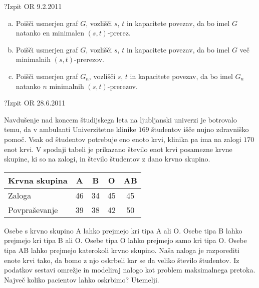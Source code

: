 \begin{naloga}{?}{Izpit OR 9.2.2011}
\begin{vprasanje}
\begin{enumerate}[(a)]
\item Poišči usmerjen graf $G$, vozlišči $s$, $t$ in kapacitete povezav,
da bo imel $G$ natanko en minimalen $(s, t)$-prerez.

\item Poišči usmerjen graf $G$, vozlišči $s$, $t$ in kapacitete povezav,
da bo imel $G$ več minimalnih $(s, t)$-prerezov.

\item Poišči usmerjen graf $G_n$, vozlišči $s$, $t$ in kapacitete povezav,
da bo imel $G_n$ natanko $n$ minimalnih $(s, t)$-prerezov.
\end{enumerate}
\end{vprasanje}
\begin{odgovor}
\end{odgovor}
\end{naloga}


\begin{naloga}{?}{Izpit OR 28.6.2011}
\begin{vprasanje}[kri]
Navdušenje nad koncem študijskega leta na ljubljanski univerzi
je botrovalo temu,
da v ambulanti Univerzitetne klinike
$169$ študentov išče nujno zdravniško pomoč.
Vsak od študentov potrebuje eno enoto krvi,
klinika pa ima na zalogi $170$ enot krvi.
V spodnji tabeli je prikazano število enot krvi posamezne krvne skupine,
ki so na zalogi,
in število študentov z dano krvno skupino.
\begin{center}
\begin{tabular}{l|cccc}
Krvna skupina &  A &  B &  O & AB \\ \hline
Zaloga        & 46 & 34 & 45 & 45 \\
Povpraševanje & 39 & 38 & 42 & 50
\end{tabular}
\end{center}
Osebe s krvno skupino A lahko prejmejo kri tipa A ali O.
Osebe tipa B lahko prejmejo kri tipa B ali O.
Osebe tipa O lahko prejmejo samo kri tipa O.
Osebe tipa AB lahko prejmejo katerokoli krvno skupino.
Naša naloga je razporediti enote krvi tako,
da bomo z njo oskrbeli kar se da veliko število študentov.
Iz podatkov sestavi omrežje
in modeliraj nalogo kot problem maksimalnega pretoka.
Največ koliko pacientov lahko oskrbimo?
Utemelji.
\end{vprasanje}
\begin{odgovor}
\end{odgovor}
\end{naloga}



